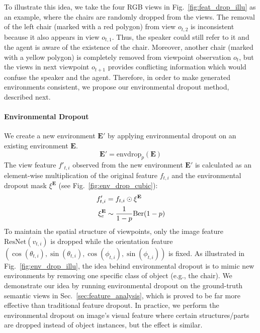 \documentclass[11pt,a4paper]{article}
\begin{document}
To illustrate this idea, we take the four RGB views in Fig.~\ref{fig:feat_drop_illu} as an example, where the chairs are randomly dropped from the views.
The removal of the left chair (marked with a red polygon) from view $o_{t,2}$ is inconsistent because it also appears in view $o_{t,1}$.
Thus, the speaker could still refer to it and the agent is aware of the existence of the chair.
Moreover, another chair (marked with a yellow polygon) is completely removed from viewpoint observation $o_t$, but the views in next viewpoint $o_{t+1}$ provides conflicting information which would confuse the speaker and the agent.
Therefore, in order to make generated environments consistent, we propose our environmental dropout method, described next. 
\paragraph{Environmental Dropout}
We create a new environment $\mathbf{E'}$ by applying environmental dropout on an existing environment $\mathbf{E}$.
\begin{equation}
    \mathbf {E'}   =  \mathrm{envdrop}_p(\mathbf{E})
\end{equation}
The view feature $f'_{t,i}$ observed from the new environment $\mathbf {E'}$ is calculated as an element-wise multiplication of the original feature $f_{t,i}$ and the environmental dropout mask $\xi^{\mathbf E}$ (see Fig.~\ref{fig:env_drop_cubic}):
\vspace{-5pt}
\begin{align}
    f'_{t,i}  & = f_{t,i} \odot \xi^{\mathbf E} \\
    \xi_e^{\mathbf E} & \sim \frac{1}{1-p} \mathrm{Ber}(1-p) \vspace{-5pt}
\end{align}
To maintain the spatial structure of viewpoints, only the image feature $\mathrm{ResNet}(v_{t,i})$ is dropped while the orientation feature $( \cos(\theta_{t,i}), \sin(\theta_{t,i}), \cos(\phi_{t,i}), \sin(\phi_{t,i}) )$ is fixed. 
As illustrated in Fig.~\ref{fig:env_drop_illu}, the idea behind environmental dropout is to mimic new environments by removing one specific class of object (e.g., the chair).
We demonstrate our idea by running environmental dropout on the ground-truth semantic views in Sec.~\ref{sec:feature_analysis}, which is proved to be far more effective than traditional feature dropout.
In practice, we perform the environmental dropout on image's visual feature where certain structures/parts are dropped instead of object instances, but the effect is similar.
\end{document}
